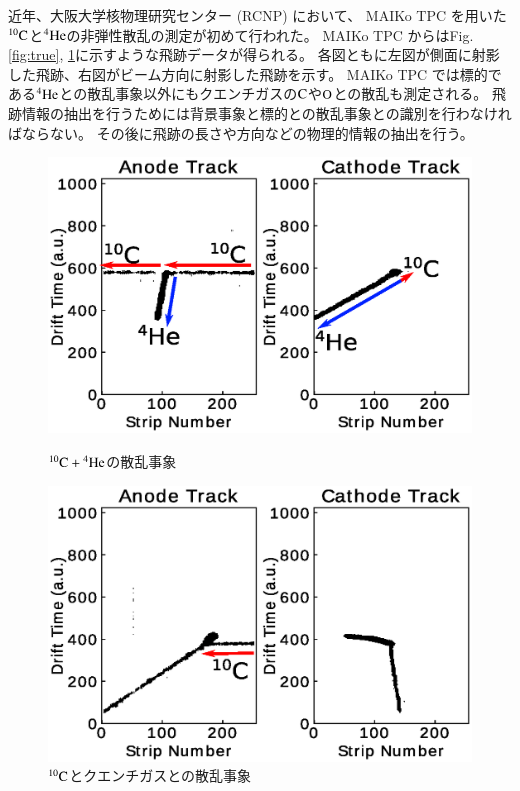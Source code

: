 \documentclass{jps-cp}
\begin{document}
近年、大阪大学核物理研究センター (RCNP) において、
MAIKo TPC を用いた${}^{10}\rm{C}$と${}^{4}\rm{He}$の非弾性散乱の測定が初めて行われた。
MAIKo TPC からはFig. \ref{fig:true}, \ref{fig:false}に示すような飛跡データが得られる。
各図ともに左図が側面に射影した飛跡、右図がビーム方向に射影した飛跡を示す。
MAIKo TPC では標的である${}^{4}\rm{He}$との散乱事象以外にもクエンチガスの$\rm{C}$や$\rm{O}$との散乱も測定される。
飛跡情報の抽出を行うためには背景事象と標的との散乱事象との識別を行わなければならない。
その後に飛跡の長さや方向などの物理的情報の抽出を行う。

\begin{figure}
  \centering
  \begin{minipage}{0.4\columnwidth}
    \centering
    \includegraphics[clip, width=0.9\columnwidth]{eps/true.eps}
    \caption{${}^{10}\rm{C}+{}^{4}\rm{He}$の散乱事象}
    \label{fig:true}
  \end{minipage}
  \begin{minipage}{0.4\columnwidth}
    \centering
    \includegraphics[clip, width=0.9\columnwidth]{eps/false.eps}
    \caption{${}^{10}\rm{C}$とクエンチガスとの散乱事象}
    \label{fig:false}
  \end{minipage}
\end{figure}
\end{document}
